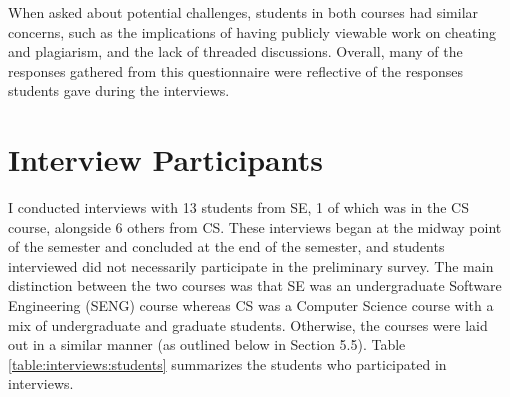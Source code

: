 When asked about potential challenges, students in both courses had similar concerns, such as the implications of having publicly viewable work on cheating and plagiarism, and the lack of threaded discussions. Overall, many of the responses gathered from this questionnaire were reflective of the responses students gave during the interviews.

\section{Interview Participants}
I conducted interviews with 13 students from SE, 1 of which was in the CS course, alongside 6 others from CS. These interviews began at the midway point of the semester and concluded at the end of the semester, and students interviewed did not necessarily participate in the preliminary survey. The main distinction between the two courses was that SE was an undergraduate Software Engineering (SENG) course whereas CS was a Computer Science course with a mix of undergraduate and graduate students. Otherwise, the courses were laid out in a similar manner (as outlined below in Section 5.5). Table \ref{table:interviews:students} summarizes the students who participated in interviews.

